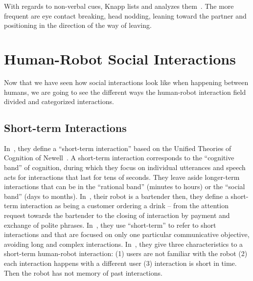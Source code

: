 \documentclass[a4paper,11pt,twoside]{StyleThese}
\begin{document}
With regards to non-verbal cues,  Knapp \etal lists and analyzes them~\cite{knapp_1973_rhetoric}. The more frequent are eye contact breaking,  head nodding, leaning toward the partner and positioning in the direction of the way of leaving.

\section{Human-Robot Social Interactions}

Now that we have seen how social interactions look like when happening between humans, we are going to see the different ways the human-robot interaction field divided and categorized interactions. 

\subsection{Short-term Interactions}
In~\cite{zheng_2013_designing}, they define a ``short-term interaction'' based on the Unified Theories of Cognition of Newell~\cite{newell_1994_unified}. A short-term interaction corresponds to the ``cognitive band'' of cognition, during which they focus on individual utterances and speech acts for interactions that last for tens of seconds. They leave aside longer-term interactions that can be in the ``rational band'' (minutes to hours) or the ``social band'' (days to months).
In~\cite{gaschler_2012_modelling}, their robot is a bartender then, they define a short-term interaction as being a customer ordering a drink – from the attention request towards the bartender to the closing of interaction by payment and exchange of polite phrases.
In~\cite{iocchi_2015_personalized}, they use ``short-term'' to refer to short interactions and that are focused on only one particular communicative objective, avoiding long and complex interactions.
In~\cite{sanelli_2017_short}, they give three characteristics to a short-term human-robot interaction: (1) users are not familiar with the robot (2) each interaction happens with a different user (3) interaction is short in time. Then the robot has not memory of past interactions.
\end{document}
